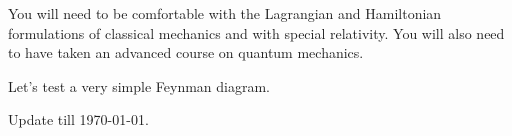 \documentclass[a4paper,11pt]{article}
\begin{document}
	You will need to be comfortable with the Lagrangian and Hamiltonian formulations of classical mechanics and with special relativity. You will also need to have taken an advanced course on quantum mechanics.

	\newpage
	\tableofcontents
	\newpage
	\maintext
	Let's test a very simple Feynman diagram.

	
	\begin{center}
	\end{center}
		
	Update till \today.

	
\end{document}
